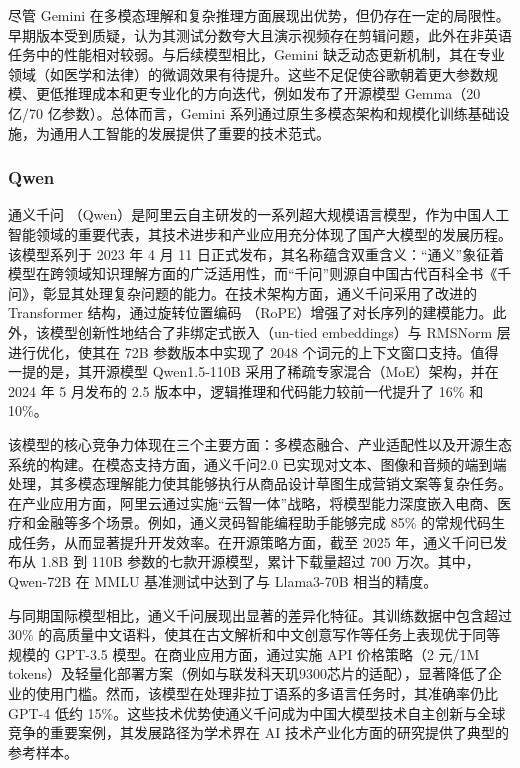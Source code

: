 尽管 Gemini 在多模态理解和复杂推理方面展现出优势，但仍存在一定的局限性。早期版本受到质疑，认为其测试分数夸大且演示视频存在剪辑问题，此外在非英语任务中的性能相对较弱。与后续模型相比，Gemini 缺乏动态更新机制，其在专业领域（如医学和法律）的微调效果有待提升。这些不足促使谷歌朝着更大参数规模、更低推理成本和更专业化的方向迭代，例如发布了开源模型 Gemma（20 亿/70 亿参数）。总体而言，Gemini 系列通过原生多模态架构和规模化训练基础设施，为通用人工智能的发展提供了重要的技术范式。

\subsubsection{Qwen}
\label{sec:TOSWT-gen-qwen}

通义千问 \cite{qwen2025qwen25technicalreport}（Qwen）是阿里云自主研发的一系列超大规模语言模型，作为中国人工智能领域的重要代表，其技术进步和产业应用充分体现了国产大模型的发展历程。该模型系列于 2023 年 4 月 11 日正式发布，其名称蕴含双重含义：“通义”象征着模型在跨领域知识理解方面的广泛适用性，而“千问”则源自中国古代百科全书《千问》，彰显其处理复杂问题的能力。在技术架构方面，通义千问采用了改进的 Transformer 结构，通过旋转位置编码 \cite{su2023roformerenhancedtransformerrotary}（RoPE）增强了对长序列的建模能力。此外，该模型创新性地结合了非绑定式嵌入（un-tied embeddings）与 RMSNorm 层进行优化，使其在 72B 参数版本中实现了 2048 个词元的上下文窗口支持。值得一提的是，其开源模型 Qwen1.5-110B 采用了稀疏专家混合（MoE）架构，并在 2024 年 5 月发布的 2.5 版本中，逻辑推理和代码能力较前一代提升了 16\% 和 10\%。

该模型的核心竞争力体现在三个主要方面：多模态融合、产业适配性以及开源生态系统的构建。在模态支持方面，通义千问2.0 已实现对文本、图像和音频的端到端处理，其多模态理解能力使其能够执行从商品设计草图生成营销文案等复杂任务。在产业应用方面，阿里云通过实施“云智一体”战略，将模型能力深度嵌入电商、医疗和金融等多个场景。例如，通义灵码智能编程助手能够完成 85\% 的常规代码生成任务，从而显著提升开发效率。在开源策略方面，截至 2025 年，通义千问已发布从 1.8B 到 110B 参数的七款开源模型，累计下载量超过 700 万次。其中，Qwen-72B 在 MMLU 基准测试中达到了与 Llama3-70B 相当的精度。

与同期国际模型相比，通义千问展现出显著的差异化特征。其训练数据中包含超过 30\% 的高质量中文语料，使其在古文解析和中文创意写作等任务上表现优于同等规模的 GPT-3.5 模型。在商业应用方面，通过实施 API 价格策略（2 元/1M tokens）及轻量化部署方案（例如与联发科天玑9300芯片的适配），显著降低了企业的使用门槛。然而，该模型在处理非拉丁语系的多语言任务时，其准确率仍比 GPT-4 低约 15\%。这些技术优势使通义千问成为中国大模型技术自主创新与全球竞争的重要案例，其发展路径为学术界在 AI 技术产业化方面的研究提供了典型的参考样本。

